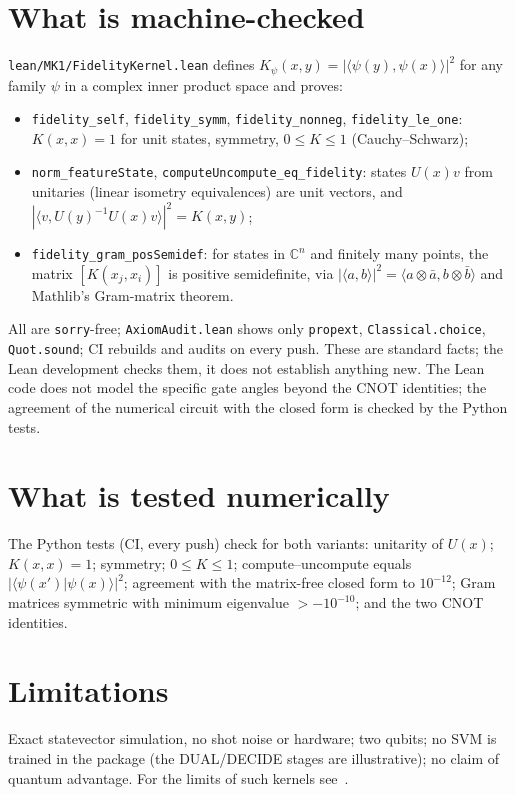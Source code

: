 \documentclass[11pt]{article}
\begin{document}
\section{What is machine-checked}
\texttt{lean/MK1/FidelityKernel.lean} defines $K_\psi(x,y)=|\langle\psi(y),\psi(x)\rangle|^2$ for any family $\psi$ in a complex inner product space and proves:
\begin{itemize}
\item \texttt{fidelity\_self}, \texttt{fidelity\_symm}, \texttt{fidelity\_nonneg}, \texttt{fidelity\_le\_one}: $K(x,x)=1$ for unit states, symmetry, $0\le K\le1$ (Cauchy--Schwarz);
\item \texttt{norm\_featureState}, \texttt{computeUncompute\_eq\_fidelity}: states $U(x)v$ from unitaries (linear isometry equivalences) are unit vectors, and $|\langle v,U(y)^{-1}U(x)v\rangle|^2=K(x,y)$;
\item \texttt{fidelity\_gram\_posSemidef}: for states in $\mathbb{C}^n$ and finitely many points, the matrix $[K(x_j,x_i)]$ is positive semidefinite,
via $|\langle a,b\rangle|^2=\langle a\otimes\bar a,b\otimes\bar b\rangle$ and Mathlib's Gram-matrix theorem.
\end{itemize}
All are \texttt{sorry}-free; \texttt{AxiomAudit.lean} shows only \texttt{propext}, \texttt{Classical.choice}, \texttt{Quot.sound}; CI rebuilds and audits on every push.
These are standard facts; the Lean development checks them, it does not establish anything new.
The Lean code does not model the specific gate angles beyond the CNOT identities; the agreement of the numerical circuit with the closed form is checked by the Python tests.

\section{What is tested numerically}
The Python tests (CI, every push) check for both variants: unitarity of $U(x)$; $K(x,x)=1$; symmetry; $0\le K\le1$;
compute--uncompute equals $|\langle\psi(x')|\psi(x)\rangle|^2$; agreement with the matrix-free closed form to $10^{-12}$;
Gram matrices symmetric with minimum eigenvalue $>-10^{-10}$; and the two CNOT identities.

\section{Limitations}
Exact statevector simulation, no shot noise or hardware; two qubits; no SVM is trained in the package (the DUAL/DECIDE stages are illustrative);
no claim of quantum advantage. For the limits of such kernels see~\cite{kubler}.
\end{document}
